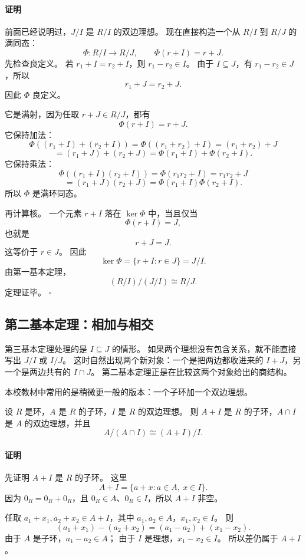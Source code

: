 \paragraph*{证明}
前面已经说明过，$J/I$ 是 $R/I$ 的双边理想。
现在直接构造一个从 $R/I$ 到 $R/J$ 的满同态：
\[
\Phi:R/I\to R/J,\qquad \Phi(r+I)=r+J.
\]
先检查良定义。
若 $r_1+I=r_2+I$，则 $r_1-r_2\in I$。
由于 $I\subseteq J$，有 $r_1-r_2\in J$，所以
\[
r_1+J=r_2+J.
\]
因此 $\Phi$ 良定义。

它是满射，因为任取 $r+J\in R/J$，都有
\[
\Phi(r+I)=r+J.
\]
它保持加法：
\[
\Phi((r_1+I)+(r_2+I))
=\Phi((r_1+r_2)+I)
=(r_1+r_2)+J
\]
\[
=(r_1+J)+(r_2+J)
=\Phi(r_1+I)+\Phi(r_2+I).
\]
它保持乘法：
\[
\Phi((r_1+I)(r_2+I))
=\Phi(r_1r_2+I)
=r_1r_2+J
\]
\[
=(r_1+J)(r_2+J)
=\Phi(r_1+I)\Phi(r_2+I).
\]
所以 $\Phi$ 是满环同态。

再计算核。
一个元素 $r+I$ 落在 $\ker\Phi$ 中，当且仅当
\[
\Phi(r+I)=J,
\]
也就是
\[
r+J=J.
\]
这等价于 $r\in J$。
因此
\[
\ker\Phi=\{r+I:r\in J\}=J/I.
\]
由第一基本定理，
\[
(R/I)/(J/I)\cong R/J.
\]
定理证毕。 $\square$

\subsection{第二基本定理：相加与相交}\label{sec:second-isomorphism-theorem-rings}

第三基本定理处理的是 $I\subseteq J$ 的情形。
如果两个理想没有包含关系，就不能直接写出 $J/I$ 或 $I/J$。
这时自然出现两个新对象：一个是把两边都收进来的 $I+J$，另一个是两边共有的 $I\cap J$。
第二基本定理正是在比较这两个对象给出的商结构。

本校教材中常用的是稍微更一般的版本：一个子环加一个双边理想。

\begin{theorem}[环同态第二基本定理]\label{thm:second-isomorphism-theorem-rings}
设 $R$ 是环，$A$ 是 $R$ 的子环，$I$ 是 $R$ 的双边理想。
则 $A+I$ 是 $R$ 的子环，$A\cap I$ 是 $A$ 的双边理想，并且
\[
A/(A\cap I)\cong (A+I)/I.
\]
\end{theorem}

\paragraph*{证明}
先证明 $A+I$ 是 $R$ 的子环。
这里
\[
A+I=\{a+x:a\in A,\ x\in I\}.
\]
因为 $0_R=0_R+0_R$，且 $0_R\in A$、$0_R\in I$，所以 $A+I$ 非空。

任取 $a_1+x_1,a_2+x_2\in A+I$，其中 $a_1,a_2\in A$，$x_1,x_2\in I$。
则
\[
(a_1+x_1)-(a_2+x_2)=(a_1-a_2)+(x_1-x_2).
\]
由于 $A$ 是子环，$a_1-a_2\in A$；
由于 $I$ 是理想，$x_1-x_2\in I$。
所以差仍属于 $A+I$。

